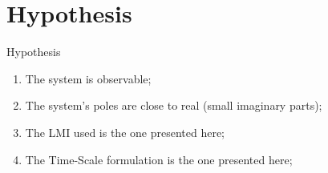 
\section{Hypothesis}%
\label{sec:hypothesis}

\begin{slide}{Hypothesis}
  \begin{enumerate}
    \item The system is observable; \label{item:hypo1}
    \item The system's poles are close to real (small imaginary parts); \label{item:hypo2}
    \item The LMI used is the one presented here; \label{item:hypo3}
    \item The Time-Scale formulation is the one presented here; \label{item:hypo4}
  \end{enumerate}
\end{slide}
